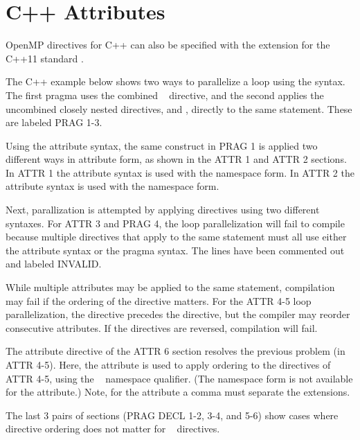 \section{C++ Attributes}
\label{sec:attributes}

OpenMP directives for C++ can also be specified with 
the  extension for the C++11 standard .

The C++ example below shows two ways to parallelize a  loop using the  syntax.
The first pragma uses the combined ~ directive, and the second
applies the uncombined closely nested directives,  and , directly to the same statement. 
These are labeled PRAG 1-3.

Using the attribute syntax, the same construct in PRAG 1
is applied two different ways in attribute form, as shown in the ATTR 1 and ATTR 2 sections.
In ATTR 1 the attribute syntax is used with the  namespace form.
In ATTR 2 the attribute syntax is used with the  namespace form.

Next, parallization is attempted by applying directives using two different syntaxes.
For ATTR 3 and PRAG 4, the loop parallelization will fail to compile because multiple directives that
apply to the same statement must all use either the attribute syntax or the pragma syntax.
The lines have been commented out and labeled INVALID.

While multiple attributes may be applied to the same statement,
compilation may fail if the ordering of the directive matters.
For the ATTR 4-5 loop parallelization, the  directive precedes 
the  directive, but the compiler may reorder consecutive attributes.
If the directives are reversed, compilation will fail.

The attribute directive of the ATTR 6 section resolves the previous problem (in ATTR 4-5).
Here, the  attribute is used to apply ordering to the
directives of ATTR 4-5, using the ~\code{::} namespace qualifier. (The
 namespace form is not available for the  attribute.) 
Note, for the  attribute a comma must separate the  extensions.


The last 3 pairs of sections (PRAG DECL 1-2, 3-4, and 5-6) show cases where 
directive ordering does not matter for ~ directives. 

